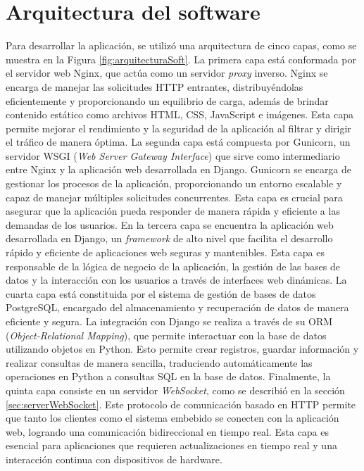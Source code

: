 \section{Arquitectura del software}
Para desarrollar la aplicación, se utilizó una arquitectura de cinco capas, como se muestra en la Figura \ref{fig:arquitecturaSoft}. La primera capa está conformada por el servidor web Nginx, que actúa como un servidor \textit{proxy} inverso. Nginx se encarga de manejar las solicitudes HTTP entrantes, distribuyéndolas eficientemente y proporcionando un equilibrio de carga, además de brindar contenido estático como archivos HTML, CSS, JavaScript e imágenes. Esta capa permite mejorar el rendimiento y la seguridad de la aplicación al filtrar y dirigir el tráfico de manera óptima. La segunda capa está compuesta por Gunicorn, un servidor WSGI (\textit{Web Server Gateway Interface}) que sirve como intermediario entre Nginx y la aplicación web desarrollada en Django. Gunicorn se encarga de gestionar los procesos de la aplicación, proporcionando un entorno escalable y capaz de manejar múltiples solicitudes concurrentes. Esta capa es crucial para asegurar que la aplicación pueda responder de manera rápida y eficiente a las demandas de los usuarios. En la tercera capa se encuentra la aplicación web desarrollada en Django, un \textit{framework} de alto nivel que facilita el desarrollo rápido y eficiente de aplicaciones web seguras y mantenibles.  Esta capa es responsable de la lógica de negocio de la aplicación, la gestión de las bases de datos y la interacción con los usuarios a través de interfaces web dinámicas. La cuarta capa está constituida por el sistema de gestión de bases de datos PostgreSQL, encargado del almacenamiento y recuperación de datos de manera eficiente y segura. La integración con Django se realiza a través de su ORM (\textit{Object-Relational Mapping}), que permite interactuar con la base de datos utilizando objetos en Python. Esto permite crear registros, guardar información y realizar consultas de manera sencilla, traduciendo automáticamente las operaciones en Python a consultas SQL en la base de datos. Finalmente, la quinta capa consiste en un servidor \textit{WebSocket}, como se describió en la sección \ref{sec:serverWebSocket}. Este protocolo de comunicación basado en HTTP permite que tanto los clientes como el sistema embebido se conecten con la aplicación web, logrando una comunicación bidireccional en tiempo real. Esta capa es esencial para aplicaciones que requieren actualizaciones en tiempo real y una interacción continua con dispositivos de hardware.

